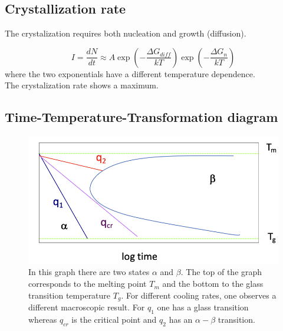 \documentclass[../phys-f308.tex]{subfiles}
\begin{document}
    \subsection{Crystallization rate}

    \begin{property}
        The crystalization requires both nucleation and growth (diffusion).

        \begin{equation}
            I = \frac{dN}{dt}\approx A\exp\left(-\frac{\Delta G_{diff}}{kT}\right)\exp\left(-\frac{\Delta G_n}{kT}\right)
        \end{equation}
        where the two exponentials have a different temperature dependence.\\

        The crystalization rate shows a maximum.
    \end{property}

    \subsection{Time-Temperature-Transformation diagram}

    \begin{figure}
        \begin{centering}
            \includegraphics{Pictures/Cooling_rates.png}
            \caption{In this graph there are two states $\alpha$ and $\beta$. The top of the graph corresponds to the melting point $T_m$ and the bottom to the glass transition temperature $T_g$. For different cooling rates, one observes a different macroscopic result. For $q_1$ one has a glass transition whereas $q_{cr}$ is the critical point and $q_2$ has an $\alpha-\beta$ transition.}
        \end{centering}\label{fig: TTT}
    \end{figure}
\end{document}
